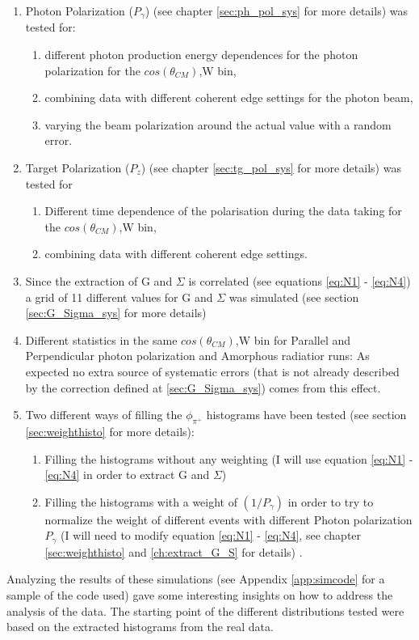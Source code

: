 \begin{enumerate}
\item Photon Polarization ($P_{\gamma}$) (see chapter \ref{sec:ph_pol_sys} for more details) was tested for:
  \begin{enumerate}
  \item different photon production energy dependences for the photon polarization for the $cos(\theta_{CM})$,W bin,
  \item combining data with different coherent edge settings for the photon beam,
  \item varying the beam polarization around the actual value with a random error.
  \end{enumerate}
\item Target Polarization ($P_z$) (see chapter \ref{sec:tg_pol_sys} for more details) was tested for
  \begin{enumerate}
  \item Different time dependence of the polarisation during the data taking for the $cos(\theta_{CM})$,W bin,
  \item combining data with different coherent edge settings.
  \end{enumerate}
\item Since the extraction of G and $\Sigma$ is correlated (see  equations \ref{eq:N1} - \ref{eq:N4}) a grid of 11 different values for G and $\Sigma$ was simulated (see section \ref{sec:G_Sigma_sys} for more details)
\item Different statistics in the same $cos(\theta_{CM})$,W bin for Parallel and Perpendicular photon polarization and Amorphous radiatior runs: As expected no extra source of systematic errors (that is not already described by the correction defined at \ref{sec:G_Sigma_sys}) comes from this effect. 
\item Two different ways of filling the $\phi_{\pi^+}$ histograms have been tested (see section \ref{sec:weighthisto} for more details):
  \begin{enumerate}
  \item Filling the histograms without any weighting (I will use equation \ref{eq:N1} - \ref{eq:N4} in order to extract G and $\Sigma$)
  \item Filling the histograms with a weight of $(1/P_{\gamma})$ in order to try to normalize the weight of different events with different Photon polarization  $P_{\gamma}$ (I will need to modify equation \ref{eq:N1} - \ref{eq:N4}, see chapter \ref{sec:weighthisto} and \ref{ch:extract_G_S} for details) .
  \end{enumerate}
\end{enumerate}
Analyzing the results of these simulations (see Appendix \ref{app:simcode} for a sample of the code used) gave some interesting insights on how to address the analysis of the data. The starting point of the different distributions tested were based on the extracted histograms from the real data.


